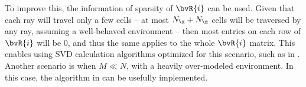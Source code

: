 To improve this, the information of sparsity of $\bvR{i}$ can be used. Given that each ray will travel only a few cells -- at most $N_{\x} + N_{\z}$ cells will be traversed by any ray, assuming a well-behaved environment -- then most entries on each row of $\bvR{i}$ will be $0$, and thus the same applies to the whole $\bvR{i}$ matrix. This enables using SVD calculation algorithms optimized for this scenario, such as in  \cite{sairabanu_parallel_2015}. Another scenario is when $M \ll N$, with a heavily over-modeled environment. In this case, the algorithm in \cite{vasudevan_hierarchical_2019} can be usefully implemented.
